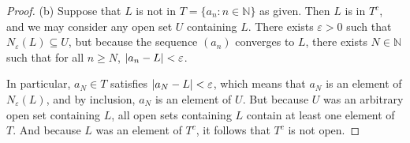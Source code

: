 \documentclass[12pt]{amsart}
\begin{document}
\begin{proof}
(b) Suppose that $L$ is not in $T = \{a_n : n\in \mathbb{N}\}$ as given. Then $L$ is in $T^c$, and we may consider any open set $U$ containing $L$. There exists $\varepsilon >0$ such that $N_{\varepsilon}(L) \subseteq U$, but because the sequence $(a_n)$ converges to $L$, there exists $N\in \mathbb{N}$ such that for all $n\geq N$, $\abs{a_n-L} < \varepsilon$.

In particular, $a_N \in T$ satisfies $\abs{a_N-L}< \varepsilon$, which means that $a_N$ is an element of $N_{\varepsilon}(L)$, and by inclusion, $a_N$ is an element of $U$. But because $U$ was an arbitrary open set containing $L$, all open sets containing $L$ contain at least one element of $T$. And because $L$ was an element of $T^c$, it follows that $T^c$ is not open.
\end{proof}
\end{document}
